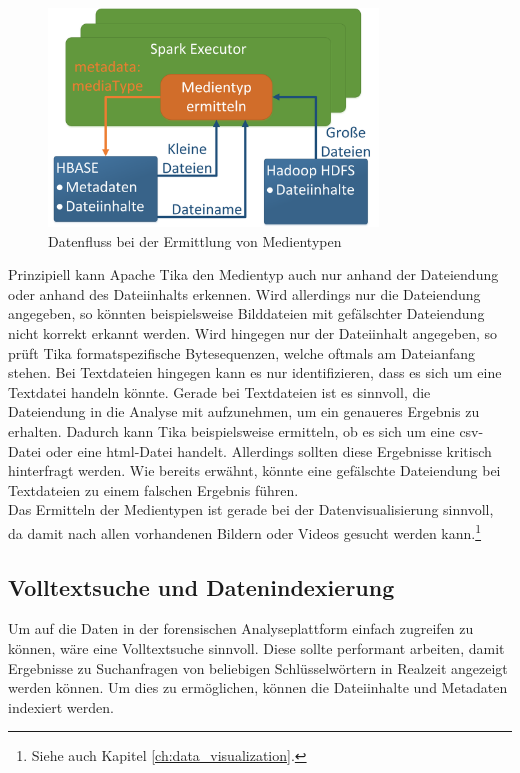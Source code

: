 \begin{figure}[ht]
  \centering
  \includegraphics[width=0.78\textwidth]{./resource/spark_processing_media_types.png}
  \caption{Datenfluss bei der Ermittlung von Medientypen}
  \label{fig:data_processing_media_types}
\end{figure}

\noindent
Prinzipiell kann Apache Tika den Medientyp auch nur anhand der Dateiendung oder anhand des Dateiinhalts erkennen. Wird allerdings nur die Dateiendung angegeben, so könnten beispielsweise Bilddateien mit gefälschter Dateiendung nicht korrekt erkannt werden. Wird hingegen nur der Dateiinhalt angegeben, so prüft Tika formatspezifische Bytesequenzen, welche oftmals am Dateianfang stehen. Bei Textdateien hingegen kann es nur identifizieren, dass es sich um eine Textdatei handeln könnte. Gerade bei Textdateien ist es sinnvoll, die Dateiendung in die Analyse mit aufzunehmen, um ein genaueres Ergebnis zu erhalten. Dadurch kann Tika beispielsweise ermitteln, ob es sich um eine \acrshort{csv}-Datei oder eine \acrshort{html}-Datei handelt. Allerdings sollten diese Ergebnisse kritisch hinterfragt werden. Wie bereits erwähnt, könnte eine gefälschte Dateiendung bei Textdateien zu einem falschen Ergebnis führen.\\
Das Ermitteln der Medientypen ist gerade bei der Datenvisualisierung sinnvoll, da damit nach allen vorhandenen Bildern oder Videos gesucht werden kann.\footnote{Siehe auch Kapitel \ref{ch:data_visualization}.}

\subsection{Volltextsuche und Datenindexierung}
\label{subsec:file_indexing}
Um auf die Daten in der forensischen Analyseplattform einfach zugreifen zu können, wäre eine Volltextsuche sinnvoll. Diese sollte performant arbeiten, damit Ergebnisse zu Suchanfragen von beliebigen Schlüsselwörtern in Realzeit angezeigt werden können. Um dies zu ermöglichen, können die Dateiinhalte und Metadaten indexiert werden.\\

